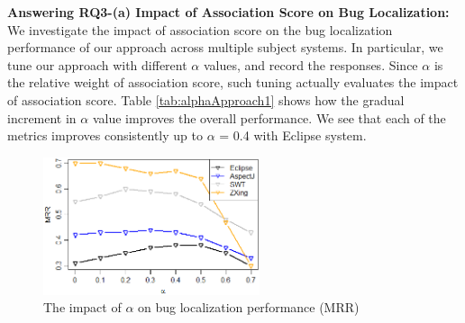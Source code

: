 \documentclass[conference]{IEEEtran}
\begin{document}
\textbf{Answering RQ3-(a) Impact of Association Score on Bug Localization:} We investigate the impact of association score on the bug localization performance of our approach across multiple subject systems. 
In particular, we tune our approach with different $\alpha$ values, and record the responses. Since $\alpha$ is the relative weight of association score, such tuning actually evaluates the impact of association score.  
Table \ref{tab:alphaApproach1} shows how the gradual increment in $\alpha$ value improves the overall performance. We see that each of the metrics improves consistently up to $\alpha$ = 0.4 with Eclipse system. 
 \begin{table}[!tb]
	\centering
	\caption{Impact of Weighting Parameter on BLuAMIR with Eclipse}
	\vspace{-.2cm}
	\label{tab:alphaApproach1}
	\centering
\end{table}
\begin{figure}[!t]
	\centering
	\includegraphics[width=2.5in]{alpha-calibration-mrr}
	\vspace{-.3cm}
	\caption{The impact of $\alpha$ on bug localization performance (MRR)}
	\label{fig:MRR-alpha-cali}
	\vspace{-.3cm}
\end{figure}
\end{document}
